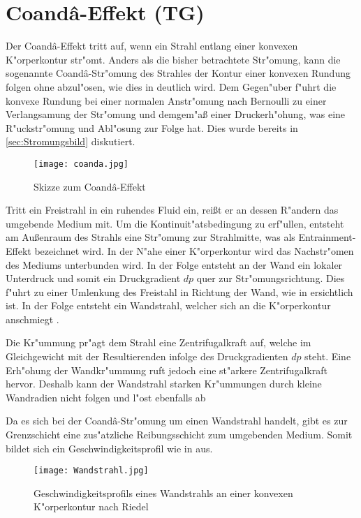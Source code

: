 \section{Coand\^{a}-Effekt (TG)}

Der Coand\^{a}-Effekt tritt auf, wenn ein Strahl entlang einer konvexen K"orperkontur str"omt. Anders als die bisher betrachtete Str"omung, kann die sogenannte Coand\^{a}-Str"omung des Strahles der Kontur einer konvexen Rundung folgen ohne abzul"osen, wie dies in  deutlich wird. Dem Gegen"uber f"uhrt die konvexe Rundung bei einer normalen Anstr"omung nach Bernoulli zu einer Verlangsamung der Str"omung und demgem"a\ss{} einer Druckerh"ohung, was eine R"uckstr"omung und Abl"osung zur Folge hat. Dies wurde bereits in \ref{sec:Stromungsbild} diskutiert.

\begin{figure}[h]
	\centering
	\texttt{[image: coanda.jpg]}
	\caption{Skizze zum Coand\^{a}-Effekt \cite{Stadlberger.2016}}
	\label{fig:coanda}
\end{figure}

Tritt ein Freistrahl in ein ruhendes Fluid ein, rei\ss{}t er an dessen R"andern das umgebende Medium mit. Um die Kontinuit"atsbedingung zu erf"ullen, entsteht am Au\ss{}enraum des Strahls eine Str"omung zur Strahlmitte, was als Entrainment-Effekt bezeichnet wird. In der N"ahe einer K"orperkontur wird das Nachstr"omen des Mediums unterbunden wird. In der Folge entsteht an der Wand ein lokaler Unterdruck und somit ein Druckgradient $dp$ quer zur Str"omungsrichtung. Dies f"uhrt zu einer Umlenkung des Freistahl in Richtung der Wand, wie in  ersichtlich ist. In der Folge entsteht ein Wandstrahl, welcher sich an die K"orperkontur anschmiegt \cite{Fernholz.1966}. 

Die Kr"ummung pr"agt dem Strahl eine Zentrifugalkraft auf, welche im Gleichgewicht mit der Resultierenden infolge des Druckgradienten $dp$ steht. Eine Erh"ohung der Wandkr"ummung ruft jedoch eine st"arkere Zentrifugalkraft hervor. Deshalb kann der Wandstrahl starken Kr"ummungen durch kleine Wandradien nicht folgen und l"ost ebenfalls ab \cite{Riedel.1971}

Da es sich bei der Coand\^{a}-Str"omung um einen Wandstrahl handelt, gibt es zur Grenzschicht eine zus"atzliche Reibungsschicht zum umgebenden Medium. Somit bildet sich ein Geschwindigkeitsprofil wie in  aus. \\
\begin{figure}[h]
	\centering
	\texttt{[image: Wandstrahl.jpg]}
	\caption{Geschwindigkeitsprofils eines Wandstrahls an einer konvexen K"orperkontur nach Riedel \cite{Riedel.1973}}
	\label{fig:Wandstrahl}
\end{figure}

